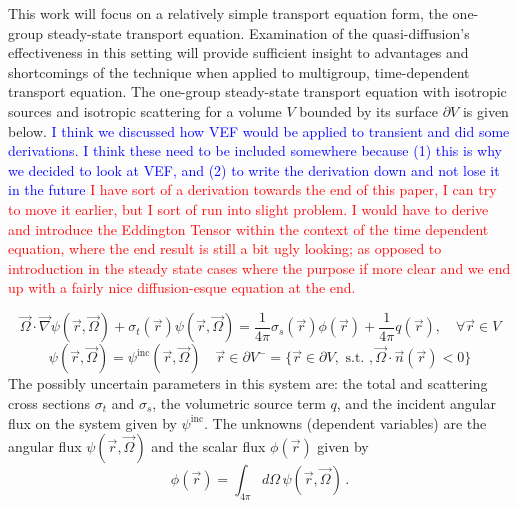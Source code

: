 \documentclass[12pt]{report}
\newcommand{\vr}{\vec{r}}
\newcommand{\vO}{\vec{\Omega}}
\newcommand{\grad}{\vec{\nabla}}
\newcommand{\sigt}{\sigma_t}
\newcommand{\sigs}{\sigma_s}
\newcommand{\comment}[2]{\marginpar{\textcolor{#2}{$\star$}}\textcolor{#2}{#1}\newline}
\newcommand{\iwh}[1]{\comment{#1}{red}}
\newcommand{\jcr}[1]{\comment{#1}{blue}}
\newcommand{\iwh}[1]{\phantom{a}}
\newcommand{\jcr}[1]{\phantom{a}}
\begin{document}
This work will focus on a relatively simple transport equation form, the one-group steady-state transport equation. Examination of the quasi-diffusion's effectiveness in this setting will provide sufficient insight to advantages and shortcomings of the technique when applied to multigroup, time-dependent transport equation. The one-group steady-state transport equation with isotropic sources and isotropic scattering for a volume $V$ bounded by its surface $\partial V$ is given below.
\jcr{I think we discussed how VEF would be applied to transient and did some derivations. I think these need to be included somewhere because (1) this is why we decided to look at VEF, and (2) to write the derivation down and not lose it in the future}
\iwh{I have sort of a derivation towards the end of this paper, I can try to move it earlier, but I sort of run into slight problem.
I would have to derive and introduce the Eddington Tensor within the context of the time dependent equation, where the end result is still a bit ugly 
looking; as opposed to introduction in the steady state cases where the purpose if more clear and we end up with a fairly nice
diffusion-esque equation at the end.}

\begin{equation}
\label{SS1GTE}
\vO \cdot \grad \psi(\vr,\vO) + \sigt(\vr) \psi(\vr,\vO) = \frac{1}{4 \pi} \sigs(\vr) \phi(\vr) + \frac{1}{4 \pi} q(\vr), \quad \forall \vr \in V
\end{equation}
\begin{equation}
\label{SS1GTE_bc}
\psi(\vr,\vO) = \psi^{\text{inc}}(\vr,\vO) \quad \vr \in \partial V^{-} = \{ \vr \in \partial V, \text{ s.t. }, \vO \cdot \vec{n}(\vr) < 0\}
\end{equation}
The possibly uncertain parameters in this system are: the total and scattering cross sections $\sigt$ and $\sigs$, the volumetric source term $q$, and the incident angular flux on the system given by $\psi^{\text{inc}}$. The unknowns (dependent variables) are the angular flux $\psi(\vr,\vO)$ and the scalar flux $\phi(\vr)$ given by
\[
\phi(\vr) = \int_{4\pi}d\Omega\,\psi(\vr,\vO) \,.
\]
\end{document}
